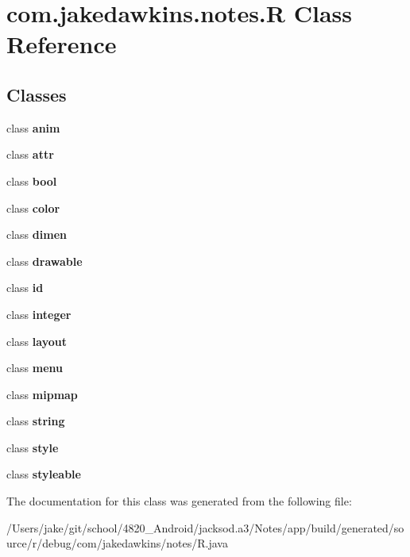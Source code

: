 \hypertarget{classcom_1_1jakedawkins_1_1notes_1_1_r}{}\section{com.\+jakedawkins.\+notes.\+R Class Reference}
\label{classcom_1_1jakedawkins_1_1notes_1_1_r}
\subsection*{Classes}
\begin{DoxyCompactItemize}
\item 
class {\bfseries anim}
\item 
class {\bfseries attr}
\item 
class {\bfseries bool}
\item 
class {\bfseries color}
\item 
class {\bfseries dimen}
\item 
class {\bfseries drawable}
\item 
class {\bfseries id}
\item 
class {\bfseries integer}
\item 
class {\bfseries layout}
\item 
class {\bfseries menu}
\item 
class {\bfseries mipmap}
\item 
class {\bfseries string}
\item 
class {\bfseries style}
\item 
class {\bfseries styleable}
\end{DoxyCompactItemize}


The documentation for this class was generated from the following file\+:\begin{DoxyCompactItemize}
\item 
/\+Users/jake/git/school/4820\+\_\+\+Android/jacksod.\+a3/\+Notes/app/build/generated/source/r/debug/com/jakedawkins/notes/R.\+java\end{DoxyCompactItemize}
